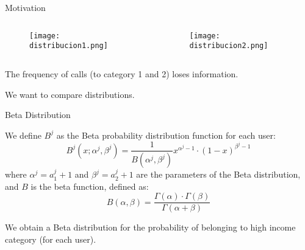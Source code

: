 \documentclass[usenames,dvipsnames]{beamer}
\newcommand{\Beta}{B}
\begin{document}
\begin{frame}{Motivation}

\begin{columns}
\begin{column}{0.49\textwidth}

\begin{figure}[h]
\begin{center}
\texttt{[image: distribucion1.png]}
\end{center}
\end{figure}
\end{column}

\begin{column}{0.49\textwidth}

\begin{figure}[h]
\begin{center}
\texttt{[image: distribucion2.png]}
\end{center}
\end{figure}

\end{column}
\end{columns}

\medskip

The frequency of calls (to category 1 and 2) loses information.

We want to compare distributions.

\end{frame}



\begin{frame}{Beta Distribution}

We define \(\Beta^j\) as the Beta probability distribution function for each user:
\begin{equation}
	\Beta^j \left( x; \alpha^j, \beta^j \right) = \frac{1}{\Beta \left( \alpha^j, \beta^j \right)} x^{\alpha^j - 1} \cdot {\left( 1 - x \right)}^{\beta^j - 1}
\label{Beta}
\end{equation}
where $\alpha^j = a^j_1 +1$ and $\beta^j = a^j_2 +1$ are the parameters of the Beta distribution,
and $\Beta$ is the beta function, defined as:
\begin{equation}
\Beta \left( \alpha, \beta \right) =
\frac{\Gamma \! \left( \alpha \right) \cdot \Gamma \! \left( \beta \right)}
{\Gamma \! \left( \alpha + \beta \right)}
\label{Beta}
\end{equation}

We obtain a Beta distribution for the probability of belonging to high income category (for each user).

\end{frame}
\end{document}
